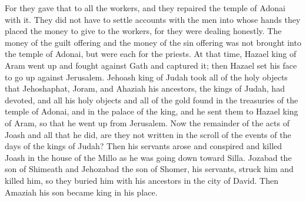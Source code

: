 \begin{biblechapter}
\verse For they gave that to all the workers, and they repaired the temple of Adonai with it.
\verse They did not have to settle accounts with the men into whose hands they placed the money to give to the workers, for they were dealing honestly.
\verse The money of the guilt offering and the money of the sin offering was not brought into the temple of Adonai, but were each for the priests.
 At that time, Hazael king of Aram went up and fought against Gath and captured it; then Hazael set his face to go up against Jerusalem.
\verse Jehoash king of Judah took all of the holy objects that Jehoshaphat, Joram, and Ahaziah his ancestors, the kings of Judah, had devoted, and all his holy objects and all of the gold found in the treasuries of the temple of Adonai, and in the palace of the king, and he sent them to Hazael king of Aram, so that he went up from Jerusalem.
\verse Now the remainder of the acts of Joash and all that he did, are they not written in the scroll of the events of the days of the kings of Judah?
\verse Then his servants arose and conspired and killed Joash in the house of the Millo as he was going down toward Silla.
\verse Jozabad the son of Shimeath and Jehozabad the son of Shomer, his servants, struck him and killed him, so they buried him with his ancestors in the city of David. Then Amaziah his son became king in his place.
\end{biblechapter}

